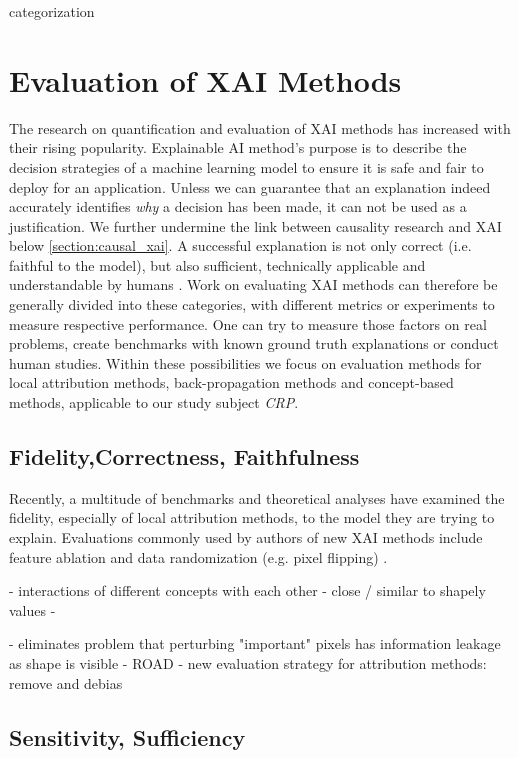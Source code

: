 categorization \cite{Samek2021}


\section{Evaluation of XAI Methods}
The research on quantification and evaluation of XAI methods has increased with their rising popularity. 
Explainable AI method's purpose is to describe the decision strategies of a machine learning model to ensure it is safe and fair to deploy for an application. 
Unless we can guarantee that an explanation indeed accurately identifies \textit{why} a decision has been made, it can not be used as a justification. We further undermine the link between causality research and XAI below \cref{section:causal_xai}.
A successful explanation is not only correct (i.e. faithful to the model), but also sufficient, technically applicable and understandable by humans \cite{Samek2021}. Work on evaluating XAI methods can therefore be generally divided into these categories, with different metrics or experiments to measure respective performance. One can try to measure those factors on real problems, create benchmarks with known ground truth explanations or conduct human studies. Within these possibilities we focus on evaluation methods for local attribution methods, back-propagation methods and concept-based methods, applicable to our study subject \textit{CRP}.

\subsection{Fidelity,Correctness, Faithfulness}

Recently, a multitude of benchmarks and theoretical analyses have examined the fidelity, especially of local attribution methods, to the model they are trying to explain. Evaluations commonly used by authors of new XAI methods include feature ablation \cite{Samek2017} and data randomization (e.g. pixel flipping) \cite{Adebayo2018}. 


\cite{Bluecher2022}
- interactions of different concepts with each other
- close / similar to shapely values
-

\cite{Rong2022}
- eliminates problem that perturbing "important" pixels has information leakage as shape is visible
- ROAD
- new evaluation strategy for attribution methods: remove and debias


\subsection{Sensitivity, Sufficiency}
\cite{Wilming2023, Clark2023}



